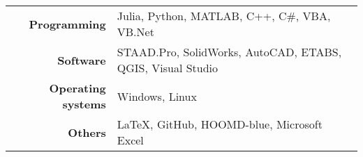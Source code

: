 
\begin{tabular}{p{}p{}}
     \multicolumn{1}{r}{\textbf{Programming}} & Julia, Python, MATLAB, C++, C\#, VBA, VB.Net\\
     \multicolumn{1}{r}{\textbf{Software}} & STAAD.Pro, SolidWorks, AutoCAD, ETABS, QGIS, Visual Studio \\
     \multicolumn{1}{r}{\textbf{Operating systems}} & Windows, Linux\\
     \multicolumn{1}{r}{\textbf{Others}} & \LaTeX, GitHub, HOOMD-blue, Microsoft Excel \\
\end{tabular}
